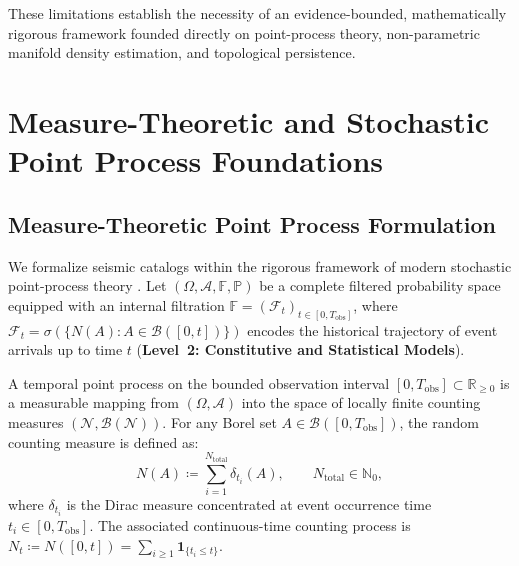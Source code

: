 These limitations establish the necessity of an evidence-bounded,
mathematically rigorous framework founded directly on point-process
theory, non-parametric manifold density estimation, and topological
persistence.

\section{Measure-Theoretic and Stochastic Point Process Foundations}
\label{sec:point_process_foundations}

\subsection{Measure-Theoretic Point Process Formulation}
\label{subsec:point_process_theory}

We formalize seismic catalogs within the rigorous framework of
modern stochastic point-process theory
\parencite{daley2003,daley2008}. Let $(\Omega, \mathcal{A},
\mathbb{F}, \mathbb{P})$ be a complete filtered probability space
equipped with an internal filtration $\mathbb{F} =
(\mathcal{F}_t)_{t \in [0, T_{\mathrm{obs}}]}$, where $\mathcal{F}_t
= \sigma(\{N(A) : A \in \mathcal{B}([0, t])\})$ encodes the
historical trajectory of event arrivals up to time $t$
(\textbf{Level~2: Constitutive and Statistical Models}).

\begin{definition}
  \label{def:counting_measure}
  A temporal point process on the bounded observation interval $[0,
  T_{\mathrm{obs}}] \subset \mathbb{R}_{\ge 0}$ is a measurable
  mapping from $(\Omega, \mathcal{A})$ into the space of locally
  finite counting measures $(\mathcal{N},
  \mathcal{B}(\mathcal{N}))$. For any Borel set $A \in
  \mathcal{B}([0, T_{\mathrm{obs}}])$, the random counting measure
  is defined as:
  \begin{equation}
    N(A) \coloneqq \sum_{i=1}^{N_{\mathrm{total}}} \delta_{t_i}(A),
    \qquad N_{\mathrm{total}} \in \mathbb{N}_0,
    \label{eq:counting_measure_def}
  \end{equation}
  where $\delta_{t_i}$ is the Dirac measure concentrated at event
  occurrence time $t_i \in [0, T_{\mathrm{obs}}]$. The associated
  continuous-time counting process is $N_t \coloneqq N([0, t]) =
  \sum_{i \ge 1} \mathbf{1}_{\{t_i \le t\}}$.
\end{definition}

